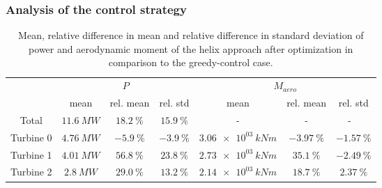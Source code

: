 \subsubsection{Analysis of the control strategy}
\begin{table}[h]
	\centering
	\caption{Mean, relative difference in mean and relative difference in standard deviation of power and aerodynamic moment of the helix approach after optimization in comparison to the greedy-control case.}
	\begin{tabular}{ccccccc}
		\toprule
		& \multicolumn{3}{c}{$P$}  & \multicolumn{3}{c}{$M_{aero}$ }\\ \cmidrule(rl){2-4} \cmidrule(rl){5-7}
		& mean & rel. mean & rel. std  & mean & rel. mean & rel. std \\ \midrule
		Total & $\SI{  11.6}{MW} $ & $\SI{ +18.2}{\%}$ & $\SI{ +15.9}{\%}$ &-&-&- \
		\\
		Turbine 0  & $\SI{  4.76}{MW} $ & $\SI{  -5.9}{\%}$ & $\SI{  -3.9}{\%}$ & $\SI{3.06e03}{kNm} $ & $\SI{ -3.97}{\%}$ & $\SI{ -1.57}{\%}$ \\
		Turbine 1  & $\SI{  4.01}{MW} $ & $\SI{ +56.8}{\%}$ & $\SI{ +23.8}{\%}$ & $\SI{2.73e03}{kNm} $ & $\SI{ +35.1}{\%}$ & $\SI{ -2.49}{\%}$ \\
		Turbine 2  & $\SI{   2.8}{MW} $ & $\SI{ +29.0}{\%}$ & $\SI{ +13.2}{\%}$ & $\SI{2.14e03}{kNm} $ & $\SI{ +18.7}{\%}$ & $\SI{ +2.37}{\%}$ \\
		\bottomrule
	\end{tabular}
	\label{tab:dipc_small_quants}
\end{table}
